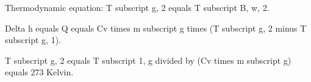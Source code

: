 Thermodynamic equation: T subscript g, 2 equals T subscript B, w, 2.

Delta h equals Q equals Cv times m subscript g times (T subscript g, 2 minus T subscript g, 1).

T subscript g, 2 equals T subscript 1, g divided by (Cv times m subscript g) equals 273 Kelvin.